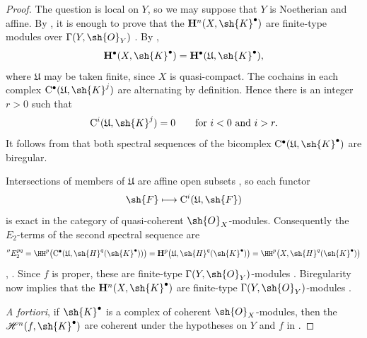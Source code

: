 \begin{proof}
The question is local on $Y$, so we may suppose that $Y$ is
Noetherian and affine.  By , it is enough to prove
that the $\mathbf{H}^n(X,\sh{K}^\bullet)$ are finite-type modules
over $\Gamma(Y,\sh{O}_Y)$ .  By
,
\[
  \mathbf{H}^\bullet(X,\sh{K}^\bullet)
  =
  \mathbf{H}^\bullet(\mathfrak{U},\sh{K}^\bullet),
\]
where $\mathfrak{U}$ may be taken finite, since $X$ is
quasi-compact.  The cochains in each complex
$\mathrm{C}^\bullet(\mathfrak{U},\sh{K}^j)$ are alternating by
definition.  Hence there is an integer $r>0$ such that
\[
  \mathrm{C}^i(\mathfrak{U},\sh{K}^j)=0
  \qquad\text{for }i<0\text{ and }i>r.
\]
It follows from  that both spectral sequences of
the bicomplex
$\mathrm{C}^\bullet(\mathfrak{U},\sh{K}^\bullet)$ are biregular.

Intersections of members of $\mathfrak{U}$ are affine open subsets
, so each functor
\[
  \sh{F}\longmapsto\mathrm{C}^i(\mathfrak{U},\sh{F})
\]
is exact in the category of quasi-coherent $\sh{O}_X$-modules.
Consequently the $E_2$-terms of the second spectral sequence are
\[
  ''E_2^{pq}
  =
  \HH^p\bigl(
    \mathrm{C}^\bullet(
      \mathfrak{U},\sh{H}^q(\sh{K}^\bullet)
    )
  \bigr)
  =
  \mathbf{H}^p\bigl(
    \mathfrak{U},\sh{H}^q(\sh{K}^\bullet)
  \bigr)
  =
  \HH^p\bigl(X,\sh{H}^q(\sh{K}^\bullet)\bigr)
\]
, .  Since $f$ is proper, these
are finite-type $\Gamma(Y,\sh{O}_Y)$-modules
.  Biregularity now implies that the
$\mathbf{H}^n(X,\sh{K}^\bullet)$ are finite-type
$\Gamma(Y,\sh{O}_Y)$-modules .

\emph{A fortiori}, if $\sh{K}^\bullet$ is a complex of coherent
$\sh{O}_X$-modules, then the
$\mathcal{H}^n(f,\sh{K}^\bullet)$ are coherent under the
hypotheses on $Y$ and $f$ in 
.
\end{proof}

